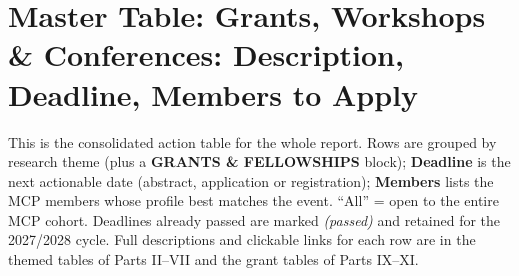 \documentclass[11pt,a4paper]{article}
\begin{document}


\newpage
\part{Master Table: Grants, Workshops \& Conferences: Description, Deadline, Members to Apply}

\noindent This is the consolidated action table for the whole report. Rows are grouped by research theme (plus a \textbf{GRANTS \& FELLOWSHIPS} block); \textbf{Deadline} is the next actionable date (abstract, application or registration); \textbf{Members} lists the MCP members whose profile best matches the event. ``All'' = open to the entire MCP cohort. Deadlines already passed are marked \emph{(passed)} and retained for the 2027/2028 cycle. Full descriptions and clickable links for each row are in the themed tables of Parts II--VII and the grant tables of Parts IX--XI.
\end{document}
